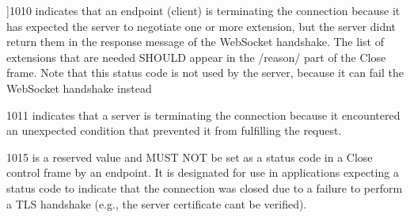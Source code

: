 \begin{Desc}
\begin{description}
{}]1010 indicates that an endpoint (client) is terminating the connection because it has expected the server to negotiate one or more extension, but the server didn\textquotesingle{}t return them in the response message of the Web\+Socket handshake. The list of extensions that are needed S\+H\+O\+U\+LD appear in the /reason/ part of the Close frame. Note that this status code is not used by the server, because it can fail the Web\+Socket handshake instead \item[{\em 
L\+W\+S\+\_\+\+C\+L\+O\+S\+E\+\_\+\+S\+T\+A\+T\+U\+S\+\_\+\+U\+N\+E\+X\+P\+E\+C\+T\+E\+D\+\_\+\+C\+O\+N\+D\+I\+T\+I\+ON\hypertarget{group__wsclose_ggae399c571df32ba532c0ca67da9284985ad0869604d79e13700ae5d196a431b350}{}\label{group__wsclose_ggae399c571df32ba532c0ca67da9284985ad0869604d79e13700ae5d196a431b350}
}]1011 indicates that a server is terminating the connection because it encountered an unexpected condition that prevented it from fulfilling the request. \item[{\em 
L\+W\+S\+\_\+\+C\+L\+O\+S\+E\+\_\+\+S\+T\+A\+T\+U\+S\+\_\+\+T\+L\+S\+\_\+\+F\+A\+I\+L\+U\+RE\hypertarget{group__wsclose_ggae399c571df32ba532c0ca67da9284985ad2b477a91c8445bf34ecd43977f9b390}{}\label{group__wsclose_ggae399c571df32ba532c0ca67da9284985ad2b477a91c8445bf34ecd43977f9b390}
}]1015 is a reserved value and M\+U\+ST N\+OT be set as a status code in a Close control frame by an endpoint. It is designated for use in applications expecting a status code to indicate that the connection was closed due to a failure to perform a T\+LS handshake (e.\+g., the server certificate can\textquotesingle{}t be verified). \end{description}
\end{Desc}

